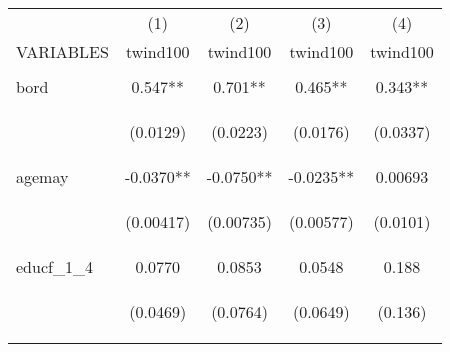 \documentclass[]{article}
\begin{document}
\begin{center}
\begin{tabular}{lcccc} \hline
 & (1) & (2) & (3) & (4) \\
VARIABLES & twind100 & twind100 & twind100 & twind100 \\ \hline
\vspace{4pt} & \begin{footnotesize}\end{footnotesize} & \begin{footnotesize}\end{footnotesize} & \begin{footnotesize}\end{footnotesize} & \begin{footnotesize}\end{footnotesize} \\
bord & 0.547** & 0.701** & 0.465** & 0.343** \\
\vspace{4pt} & \begin{footnotesize}(0.0129)\end{footnotesize} & \begin{footnotesize}(0.0223)\end{footnotesize} & \begin{footnotesize}(0.0176)\end{footnotesize} & \begin{footnotesize}(0.0337)\end{footnotesize} \\
agemay & -0.0370** & -0.0750** & -0.0235** & 0.00693 \\
\vspace{4pt} & \begin{footnotesize}(0.00417)\end{footnotesize} & \begin{footnotesize}(0.00735)\end{footnotesize} & \begin{footnotesize}(0.00577)\end{footnotesize} & \begin{footnotesize}(0.0101)\end{footnotesize} \\
educf\_1\_4 & 0.0770 & 0.0853 & 0.0548 & 0.188 \\
\vspace{4pt} & \begin{footnotesize}(0.0469)\end{footnotesize} & \begin{footnotesize}(0.0764)\end{footnotesize} & \begin{footnotesize}(0.0649)\end{footnotesize} & \begin{footnotesize}(0.136)\end{footnotesize} \\

\end{tabular}
\end{center}
\end{document}
